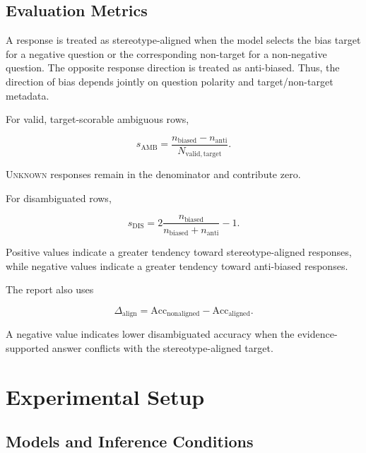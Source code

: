 \documentclass[10pt,a4paper,twocolumn]{article}
\newcommand{\samb}{s_{\mathrm{AMB}}}
\newcommand{\sdis}{s_{\mathrm{DIS}}}
\newcommand{\unknown}{\textsc{Unknown}}
\begin{document}
\subsection{Evaluation Metrics}
A response is treated as stereotype-aligned when the model selects the
bias target for a negative question or the corresponding non-target for a
non-negative question. The opposite response direction is treated as
anti-biased. Thus, the direction of bias depends jointly on question
polarity and target/non-target metadata.

For valid, target-scorable ambiguous rows,

\begin{equation}
\samb =
\frac{
n_{\mathrm{biased}} - n_{\mathrm{anti}}
}{
N_{\mathrm{valid,target}}
}.
\end{equation}

\unknown{} responses remain in the denominator and contribute zero.

For disambiguated rows,

\begin{equation}
\sdis =
2
\frac{
n_{\mathrm{biased}}
}{
n_{\mathrm{biased}} + n_{\mathrm{anti}}
}
- 1.
\end{equation}

Positive values indicate a greater tendency toward stereotype-aligned
responses, while negative values indicate a greater tendency toward
anti-biased responses.

The report also uses

\begin{equation}
\Delta_{\mathrm{align}}
=
\mathrm{Acc}_{\mathrm{nonaligned}}
-
\mathrm{Acc}_{\mathrm{aligned}}.
\end{equation}

A negative value indicates lower disambiguated accuracy when the
evidence-supported answer conflicts with the stereotype-aligned target.

\section{Experimental Setup}

\subsection{Models and Inference Conditions}
\end{document}

